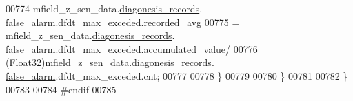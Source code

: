 \begin{DoxyCode}
00774                  mfield\_z\_sen\_data.\hyperlink{a00027_a2bd79ce84bbd6b7f50d38954f7ae475e}{diagonesis\_records}.
      \hyperlink{a00019_a55109284fe950025b5d9f3dde60d4553}{false\_alarm}.dfdt\_max\_exceded.recorded\_avg
00775                  = mfield\_z\_sen\_data.\hyperlink{a00027_a2bd79ce84bbd6b7f50d38954f7ae475e}{diagonesis\_records}.
      \hyperlink{a00019_a55109284fe950025b5d9f3dde60d4553}{false\_alarm}.dfdt\_max\_exceded.accumulated\_value/
00776                     (\hyperlink{a00072_a87d38f886e617ced2698fc55afa07637}{Float32})mfield\_z\_sen\_data.\hyperlink{a00027_a2bd79ce84bbd6b7f50d38954f7ae475e}{diagonesis\_records}.
      \hyperlink{a00019_a55109284fe950025b5d9f3dde60d4553}{false\_alarm}.dfdt\_max\_exceded.cnt;
00777 
00778              \}
00779 
00780              \}
00781 
00782 \}
00783 
00784 \textcolor{preprocessor}{#endif}
00785 
\end{DoxyCode}
